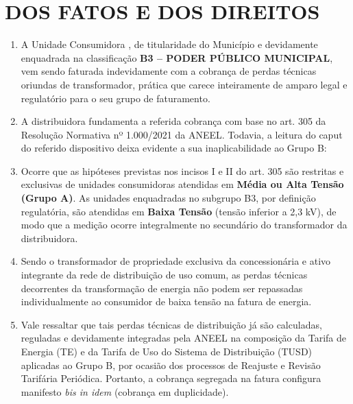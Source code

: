 \newcommand{\tipoRequerimento}{Perda por transformação}

\section{DOS FATOS E DOS DIREITOS}

\begin{enumerate}[resume]
\item A Unidade Consumidora \unidadeConsumidora{}, de titularidade do Município e devidamente enquadrada na classificação \textbf{B3 -- PODER PÚBLICO MUNICIPAL}, vem sendo faturada indevidamente com a cobrança de perdas técnicas oriundas de transformador, prática que carece inteiramente de amparo legal e regulatório para o seu grupo de faturamento.

\item A distribuidora fundamenta a referida cobrança com base no art. 305 da Resolução Normativa nº 1.000/2021 da ANEEL. Todavia, a leitura do caput do referido dispositivo deixa evidente a sua inaplicabilidade ao Grupo B:

\item Ocorre que as hipóteses previstas nos incisos I e II do art. 305 são restritas e exclusivas de unidades consumidoras atendidas em \textbf{Média ou Alta Tensão (Grupo A)}. As unidades enquadradas no subgrupo B3, por definição regulatória, são atendidas em \textbf{Baixa Tensão} (tensão inferior a 2,3 kV), de modo que a medição ocorre integralmente no secundário do transformador da distribuidora.

\item Sendo o transformador de propriedade exclusiva da concessionária e ativo integrante da rede de distribuição de uso comum, as perdas técnicas decorrentes da transformação de energia não podem ser repassadas individualmente ao consumidor de baixa tensão na fatura de energia. 

\item Vale ressaltar que tais perdas técnicas de distribuição já são calculadas, reguladas e devidamente integradas pela ANEEL na composição da Tarifa de Energia (TE) e da Tarifa de Uso do Sistema de Distribuição (TUSD) aplicadas ao Grupo B, por ocasião dos processos de Reajuste e Revisão Tarifária Periódica. Portanto, a cobrança segregada na fatura configura manifesto \textit{bis in idem} (cobrança em duplicidade).


\end{enumerate}
